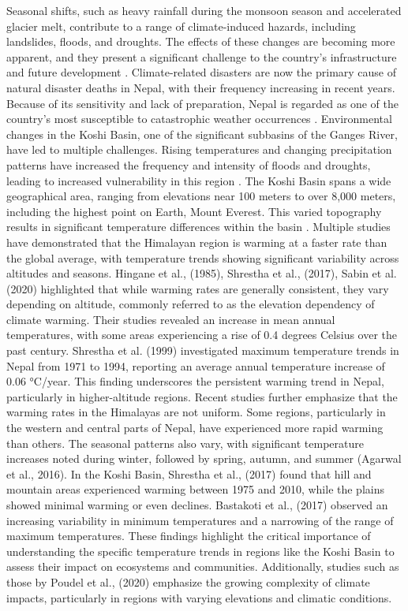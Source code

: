 Seasonal shifts, such as heavy rainfall during the monsoon season and accelerated glacier melt, contribute to a range of climate-induced hazards, including landslides, floods, and droughts. The effects of these changes are becoming more apparent, and they present a significant challenge to the country’s infrastructure and future development \citep{pokhrel_climate_2013}. Climate-related disasters are now the primary cause of natural disaster deaths in Nepal, with their frequency increasing in recent years. Because of its sensitivity and lack of preparation, Nepal is regarded as one of the country’s most susceptible to catastrophic weather occurrences \citep{aksha_spatial_2018}. Environmental changes in the Koshi Basin, one of the significant subbasins of the Ganges River, have led to multiple challenges. Rising temperatures and changing precipitation patterns have increased the frequency and intensity of floods and droughts, leading to increased vulnerability in this region \citep{bastakoti_agriculture_2017}. The Koshi Basin spans a wide geographical area, ranging from elevations near 100 meters to over 8,000 meters, including the highest point on Earth, Mount Everest. This varied topography results in significant temperature differences within the basin \citep{bhatt_climate_2014}.
Multiple studies have demonstrated that the Himalayan region is warming at a faster rate than the global average, with temperature trends showing significant variability across altitudes and seasons. Hingane et al., (1985), Shrestha et al., (2017), Sabin et al. (2020) highlighted that while warming rates are generally consistent, they vary depending on altitude, commonly referred to as the elevation dependency of climate warming. Their studies revealed an increase in mean annual temperatures, with some areas experiencing a rise of 0.4 degrees Celsius over the past century. Shrestha et al. (1999) investigated maximum temperature trends in Nepal from 1971 to 1994, reporting an average annual temperature increase of 0.06 °C/year. This finding underscores the persistent warming trend in Nepal, particularly in higher-altitude regions.
Recent studies further emphasize that the warming rates in the Himalayas are not uniform. Some regions, particularly in the western and central parts of Nepal, have experienced more rapid warming than others. The seasonal patterns also vary, with significant temperature increases noted during winter, followed by spring, autumn, and summer (Agarwal et al., 2016). In the Koshi Basin, Shrestha et al., (2017) found that hill and mountain areas experienced warming between 1975 and 2010, while the plains showed minimal warming or even declines. Bastakoti et al., (2017)   observed an increasing variability in minimum temperatures and a narrowing of the range of maximum temperatures. These findings highlight the critical importance of understanding the specific temperature trends in regions like the Koshi Basin to assess their impact on ecosystems and communities. Additionally, studies such as those by Poudel et al., (2020) emphasize the growing complexity of climate impacts, particularly in regions with varying elevations and climatic conditions. 

